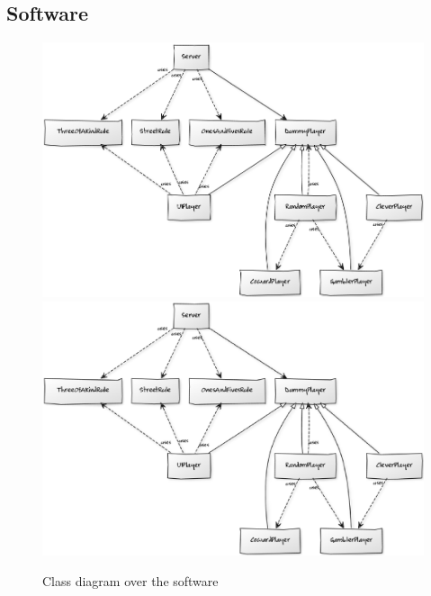 \documentclass[10pt, titlepage, oneside, a4paper]{article}
\begin{document}
		\subsection{Software}
		\begin{figure}[t]
			\centering
				\ifpdf
					\includegraphics[angle=90,width=\textwidth]{uml.png}
				\else
					\includegraphics[angle=90,width=\textwidth]{uml.eps}
				\fi
			\caption{Class diagram over the software}
			\label{fig:uml}
		\end{figure}
\end{document}
